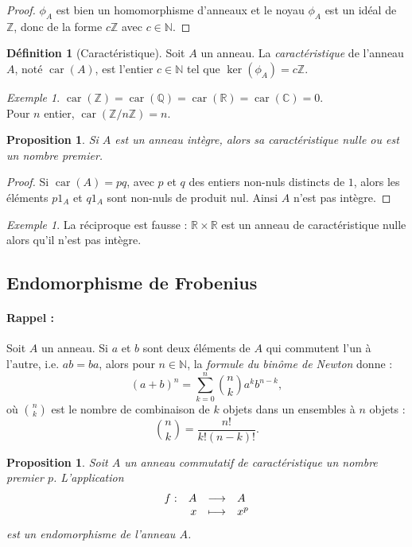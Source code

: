 \documentclass[a4paper, titlepage]{article}
\newtheorem{prop}[theo]{Proposition}
\theoremstyle{definition}
\newtheorem{defi}[theo]{Définition}
\theoremstyle{remark}
\newtheorem{exem}[theo]{Exemple}
\def\N{\mathbb N}
\def\Z{\mathbb Z}
\def\Q{\mathbb Q}
\def\R{\mathbb R}
\def\C{\mathbb C}
\def\car{\operatorname{car}}
\begin{document}
\begin{proof}
$\phi_A$ est bien un homomorphisme d'anneaux et le noyau $\phi_A$ est un idéal de $\Z$, donc de la forme $c\Z$ avec $c\in\N$.
\end{proof}

\begin{defi}[Caractéristique]
Soit $A$ un anneau. La \textit{caractéristique} de l'anneau $A$, noté $\car(A)$, est l'entier $c\in\N$ tel que $\ker(\phi_A) = c\Z$.
\end{defi}

\begin{exem}
$\car(\Z) = \car(\Q) =\car(\R) =\car(\C) = 0$. \\
Pour $n$ entier, $\car(\Z/n\Z) = n$.
\end{exem}

\begin{prop}\label{caracIntegre}
Si $A$ est un anneau intègre, alors sa caractéristique nulle ou est un nombre premier.
\end{prop}

\begin{proof}
Si $\car(A) = pq$, avec $p$ et $q$ des entiers non-nuls distincts de $1$, alors les éléments $p1_A$ et $q1_A$ sont non-nuls de produit nul. Ainsi $A$ n'est pas intègre.
\end{proof}

\begin{exem}
La réciproque est fausse : $\R\times\R$ est un anneau de caractéristique nulle alors qu'il n'est pas intègre.
\end{exem}

\subsection{Endomorphisme de Frobenius}

\paragraph*{Rappel :} Soit $A$ un anneau. Si $a$ et $b$ sont deux éléments de $A$ qui commutent l'un à l'autre, i.e. $ab = ba$, alors pour $n \in \N$, la \textit{formule du binôme de Newton} donne :
$$(a+b)^n = \sum_{k=0}^n \binom{n}{k} a^kb^{n-k},$$
où $\binom{n}{k}$ est le nombre de combinaison de $k$ objets dans un ensembles à $n$ objets : $$\binom{n}{k} = \frac{n!}{k!(n-k)!}.$$

\begin{prop}\label{propFrob}
Soit $A$ un anneau commutatif de caractéristique un nombre premier $p$. L'application 
$$\begin{array}{r r c l}
 f :& A& \longrightarrow& A \\
 & x& \longmapsto& x^p
\end{array}$$
est un endomorphisme de l'anneau $A$.
\end{prop}
\end{document}
